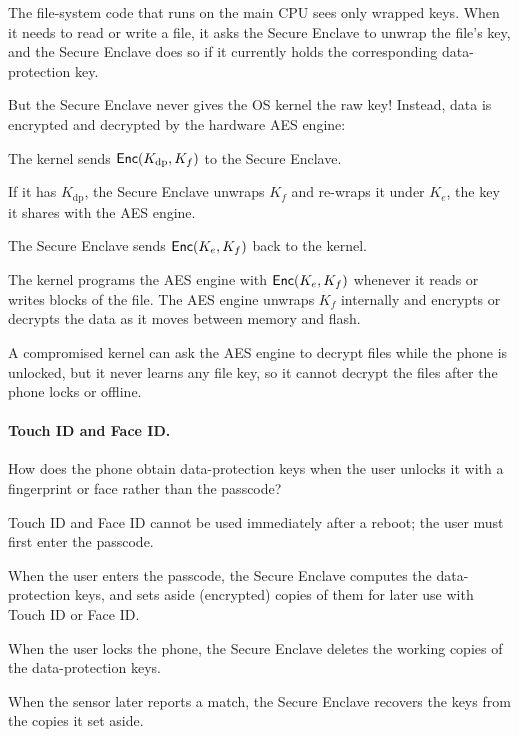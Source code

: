 The file-system code that runs on the main CPU sees only wrapped keys.
When it needs to read or write a file, it asks the Secure Enclave to
unwrap the file's key, and the Secure Enclave does so if it currently
holds the corresponding data-protection key.

But the Secure Enclave never gives the OS kernel the raw key!
Instead, data is encrypted and decrypted by the hardware AES engine:
\begin{compactenum}
  \item The kernel sends $\mathsf{Enc}(K_\text{dp}, K_f)$ to the Secure Enclave.
  \item If it has $K_\text{dp}$, the Secure Enclave unwraps $K_f$ and
        re-wraps it under $K_e$, the key it shares with the AES engine.
  \item The Secure Enclave sends $\mathsf{Enc}(K_e, K_f)$ back to the kernel.
  \item The kernel programs the AES engine with $\mathsf{Enc}(K_e, K_f)$ whenever
        it reads or writes blocks of the file. The AES engine unwraps $K_f$
        internally and encrypts or decrypts the data as it moves between
        memory and flash.
\end{compactenum}
A compromised kernel can ask the AES engine to decrypt files while the
phone is unlocked, but it never learns any file key, so it cannot decrypt
the files after the phone locks or offline.

\paragraph{Touch ID and Face ID.}
How does the phone obtain data-protection keys when the user unlocks it
with a fingerprint or face rather than the passcode?
\begin{compactitem}
  \item Touch ID and Face ID cannot be used immediately after a reboot;
        the user must first enter the passcode.
  \item When the user enters the passcode, the Secure Enclave computes the
        data-protection keys, and sets aside (encrypted) copies of them
        for later use with Touch ID or Face ID.
  \item When the user locks the phone, the Secure Enclave deletes the
        working copies of the data-protection keys.
  \item When the sensor later reports a match, the Secure Enclave recovers
        the keys from the copies it set aside.
\end{compactitem}

